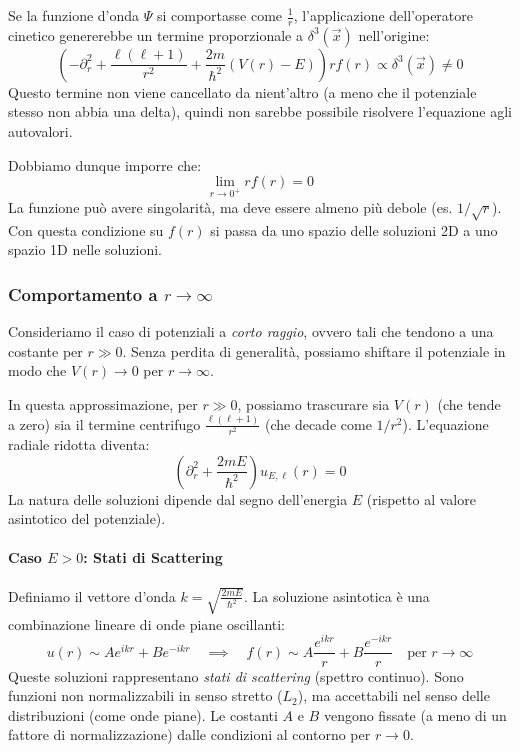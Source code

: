 Se la funzione d'onda \( \Psi \) si comportasse come \( \frac{1}{r} \), l'applicazione dell'operatore cinetico genererebbe un termine proporzionale a \( \delta^3(\vec{x}) \) nell'origine:
\[
\left( -\partial_r^2 + \frac{\ell(\ell+1)}{r^2} + \frac{2m}{\hbar^2}(V(r)-E) \right) r f(r) \propto \delta^3(\vec{x}) \neq 0
\]
Questo termine non viene cancellato da nient'altro (a meno che il potenziale stesso non abbia una delta), quindi non sarebbe possibile risolvere l'equazione agli autovalori.

Dobbiamo dunque imporre che:
\begin{equation}
\lim_{r\to 0^+} r f(r) = 0
\end{equation}
La funzione può avere singolarità, ma deve essere almeno più debole (es. \( 1/\sqrt{r} \)). 
Con questa condizione su \( f(r) \) si passa da uno spazio delle soluzioni 2D a uno spazio 1D nelle soluzioni.

\subsubsection{Comportamento a \(r\to \infty\)}
Consideriamo il caso di potenziali a \textit{corto raggio}, ovvero tali che tendono a una costante per $r \gg 0$.
Senza perdita di generalità, possiamo shiftare il potenziale in modo che $V(r) \to 0$ per $r \to \infty$.

In questa approssimazione, per $r \gg 0$, possiamo trascurare sia $V(r)$ (che tende a zero) sia il termine centrifugo $\frac{\ell(\ell+1)}{r^2}$ (che decade come $1/r^2$). L'equazione radiale ridotta diventa:
\begin{equation}
    \left( \partial_r^2 + \frac{2mE}{\hbar^2} \right) u_{E,\ell}(r) = 0
\end{equation}
La natura delle soluzioni dipende dal segno dell'energia $E$ (rispetto al valore asintotico del potenziale).

\paragraph{Caso $E > 0$: Stati di Scattering}
Definiamo il vettore d'onda $k = \sqrt{\frac{2mE}{\hbar^2}}$. La soluzione asintotica è una combinazione lineare di onde piane oscillanti:
\begin{equation}
    u(r) \sim A e^{ikr} + B e^{-ikr} \quad \implies \quad f(r) \sim A \frac{e^{ikr}}{r} + B \frac{e^{-ikr}}{r} \quad \text{per } r \to \infty
\end{equation}
Queste soluzioni rappresentano \textit{stati di scattering} (spettro continuo). Sono funzioni non normalizzabili in senso stretto ($L_2$), ma accettabili nel senso delle distribuzioni (come onde piane).
Le costanti $A$ e $B$ vengono fissate (a meno di un fattore di normalizzazione) dalle condizioni al contorno per $r \to 0$.

